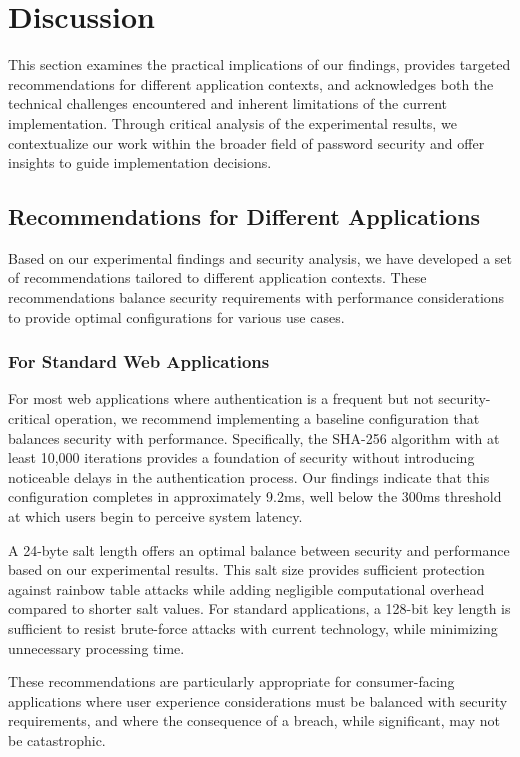 \documentclass[11pt,a4paper]{article}
\begin{document}
\section{Discussion}
This section examines the practical implications of our findings, provides targeted recommendations for different application contexts, and acknowledges both the technical challenges encountered and inherent limitations of the current implementation. Through critical analysis of the experimental results, we contextualize our work within the broader field of password security and offer insights to guide implementation decisions.
\subsection{Recommendations for Different Applications}
Based on our experimental findings and security analysis, we have developed a set of recommendations tailored to different application contexts. These recommendations balance security requirements with performance considerations to provide optimal configurations for various use cases.
\subsubsection{For Standard Web Applications}
For most web applications where authentication is a frequent but not security-critical operation, we recommend implementing a baseline configuration that balances security with performance. Specifically, the SHA-256 algorithm with at least 10,000 iterations provides a foundation of security without introducing noticeable delays in the authentication process. Our findings indicate that this configuration completes in approximately 9.2ms, well below the 300ms threshold at which users begin to perceive system latency.

A 24-byte salt length offers an optimal balance between security and performance based on our experimental results. This salt size provides sufficient protection against rainbow table attacks while adding negligible computational overhead compared to shorter salt values. For standard applications, a 128-bit key length is sufficient to resist brute-force attacks with current technology, while minimizing unnecessary processing time.

These recommendations are particularly appropriate for consumer-facing applications where user experience considerations must be balanced with security requirements, and where the consequence of a breach, while significant, may not be catastrophic.
\end{document}

